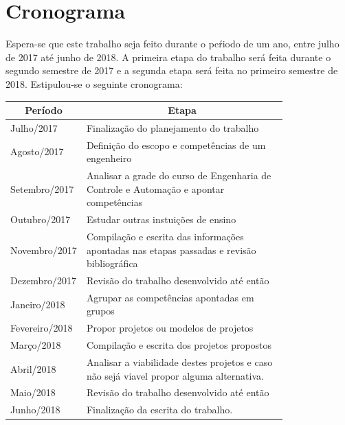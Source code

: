 \documentclass[12pt]{article} %
\begin{document}
\section{Cronograma}

Espera-se que este trabalho seja feito durante o peŕiodo de um ano, entre julho de 2017 até junho de 2018. A primeira etapa do trabalho será feita durante o segundo semestre de 2017 e a segunda etapa será feita no primeiro semestre de 2018. Estipulou-se o seguinte cronograma:

\begin{table}[htbp]
\centering
\begin{tabular}{|l|p{0.8\linewidth}|}
\hline
\multicolumn{1}{|c|}{\textbf{Período}} & \multicolumn{1}{c|}{\textbf{Etapa}}                                                   \tabularnewline \hline
Julho/2017                                              & Finalização do planejamento do trabalho
\tabularnewline \hline
Agosto/2017                                           & Definição do escopo e competências de um engenheiro
\tabularnewline \hline
Setembro/2017                                       & Analisar a grade do curso de Engenharia de Controle e Automação e apontar competências
\tabularnewline \hline
Outubro/2017                      		& Estudar outras instuições de ensino
\tabularnewline \hline
Novembro/2017                      		& Compilação e escrita das informações apontadas nas etapas passadas e revisão bibliográfica                                                                                                     \tabularnewline \hline	
Dezembro/2017                                       & Revisão do trabalho desenvolvido até então
\tabularnewline \hline
Janeiro/2018                                           & Agrupar as competências apontadas em grupos
\tabularnewline \hline
Fevereiro/2018                                       & Propor projetos ou modelos de projetos
\tabularnewline \hline
Março/2018                                             & Compilação e escrita dos projetos propostos
\tabularnewline \hline
Abril/2018                                            	& Analisar a viabilidade destes projetos e caso não sejá viavel propor alguma alternativa.
\tabularnewline \hline
Maio/2018                                            	& Revisão do trabalho desenvolvido até então
\tabularnewline \hline
Junho/2018                                            	& Finalização da escrita do trabalho.

\tabularnewline \hline
\end{tabular}
\end{table}
\end{document}
